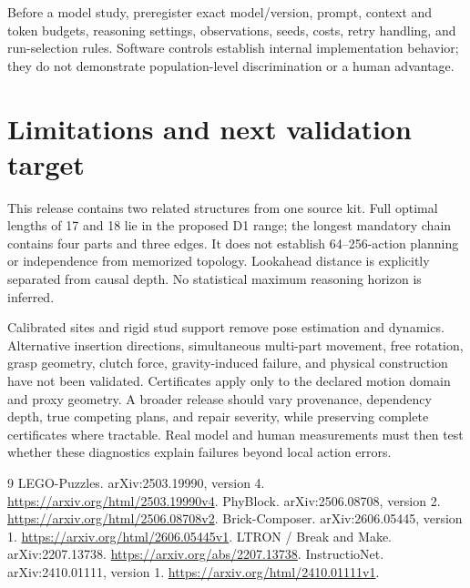 \documentclass[10pt,twocolumn]{article}
\begin{document}
Before a model study, preregister exact model/version, prompt, context and token
budgets, reasoning settings, observations, seeds, costs, retry handling, and
run-selection rules. Software controls establish internal implementation
behavior; they do not demonstrate population-level discrimination or a human
advantage.

\section{Limitations and next validation target}
This release contains two related structures from one source kit. Full optimal
lengths of 17 and 18 lie in the proposed D1 range; the longest mandatory chain
contains four parts and three edges. It does not establish 64--256-action planning
or independence from memorized topology. Lookahead distance is explicitly
separated from causal depth. No statistical maximum reasoning horizon is inferred.

Calibrated sites and rigid stud support remove pose estimation and dynamics.
Alternative insertion directions, simultaneous multi-part movement, free rotation,
grasp geometry, clutch force, gravity-induced failure, and physical construction
have not been validated. Certificates apply only to the declared motion domain
and proxy geometry. A broader release should vary provenance, dependency depth,
true competing plans, and repair severity, while preserving complete certificates
where tractable. Real model and human measurements must then test whether these
diagnostics explain failures beyond local action errors.

\begin{thebibliography}{9}\small
{} LEGO-Puzzles. arXiv:2503.19990, version 4.
\url{https://arxiv.org/html/2503.19990v4}.
 PhyBlock. arXiv:2506.08708, version 2.
\url{https://arxiv.org/html/2506.08708v2}.
 Brick-Composer. arXiv:2606.05445, version 1.
\url{https://arxiv.org/html/2606.05445v1}.
 LTRON / Break and Make. arXiv:2207.13738.
\url{https://arxiv.org/abs/2207.13738}.
 InstructioNet. arXiv:2410.01111, version 1.
\url{https://arxiv.org/html/2410.01111v1}.
\end{thebibliography}
\end{document}

